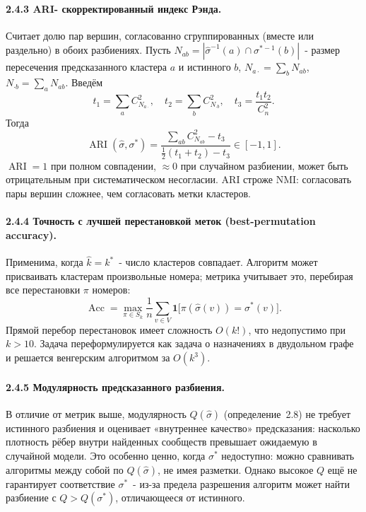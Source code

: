 \documentclass[14pt,a4paper]{extarticle}
\begin{document}
\paragraph{2.4.3 ARI- скорректированный индекс Рэнда.} Считает долю пар вершин, согласованно сгруппированных (вместе или раздельно) в обоих разбиениях. Пусть $N_{ab} = |\hat\sigma^{-1}(a) \cap \sigma^{*-1}(b)|$~- размер пересечения предсказанного кластера $a$ и истинного $b$, $N_{a\cdot} = \sum_b N_{ab}$, $N_{\cdot b} = \sum_a N_{ab}$. Введём
\[
t_1 = \sum_a C_{N_{a\cdot}}^2, \quad t_2 = \sum_b C_{N_{\cdot b}}^2, \quad t_3 = \frac{t_1 t_2}{C_n^2}.
\]
Тогда
\begin{equation}
\operatorname{ARI}(\hat\sigma, \sigma^*) = \frac{\sum_{ab} C_{N_{ab}}^2 - t_3}{\tfrac{1}{2}(t_1 + t_2) - t_3} \in [-1, 1].
\end{equation}
$\operatorname{ARI} = 1$ при полном совпадении, $\approx 0$ при случайном разбиении, может быть отрицательным при систематическом несогласии. ARI строже NMI: согласовать пары вершин сложнее, чем согласовать метки кластеров.

\paragraph{2.4.4 Точность с лучшей перестановкой меток (best-permutation accuracy).} Применима, когда $\hat k = k^*$~- число кластеров совпадает. Алгоритм может присваивать кластерам произвольные номера; метрика учитывает это, перебирая все перестановки $\pi$ номеров:
\begin{equation}
\operatorname{Acc} = \max_{\pi \in S_k} \frac{1}{n} \sum_{v \in V} \mathbf{1}\bigl[\pi(\hat\sigma(v)) = \sigma^*(v)\bigr].
\end{equation}
Прямой перебор перестановок имеет сложность $O(k!)$, что недопустимо при $k > 10$. Задача переформулируется как задача о назначениях в двудольном графе и решается венгерским алгоритмом за $O(k^3)$.

\paragraph{2.4.5 Модулярность предсказанного разбиения.} В отличие от метрик выше, модулярность $Q(\hat\sigma)$ (определение~2.8) не требует истинного разбиения и оценивает «внутреннее качество» предсказания: насколько плотность рёбер внутри найденных сообществ превышает ожидаемую в случайной модели. Это особенно ценно, когда $\sigma^*$ недоступно: можно сравнивать алгоритмы между собой по $Q(\hat\sigma)$, не имея разметки. Однако высокое $Q$ ещё не гарантирует соответствие $\sigma^*$~- из-за предела разрешения алгоритм может найти разбиение с $Q > Q(\sigma^*)$, отличающееся от истинного.
\end{document}
